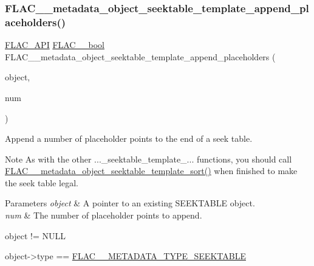 \subsubsection{\texorpdfstring{F\+L\+A\+C\+\_\+\+\_\+metadata\+\_\+object\+\_\+seektable\+\_\+template\+\_\+append\+\_\+placeholders()}{FLAC\_\_metadata\_object\_seektable\_template\_append\_placeholders()}}
{\footnotesize\ttfamily \hyperlink{group__flac__export_ga56ca07df8a23310707732b1c0007d6f5}{F\+L\+A\+C\+\_\+\+A\+PI} \hyperlink{ordinals_8h_a95103469f1cbd78b8cf250194985b34e}{F\+L\+A\+C\+\_\+\+\_\+bool} F\+L\+A\+C\+\_\+\+\_\+metadata\+\_\+object\+\_\+seektable\+\_\+template\+\_\+append\+\_\+placeholders (\begin{DoxyParamCaption}\item[{\hyperlink{struct_f_l_a_c_____stream_metadata}{F\+L\+A\+C\+\_\+\+\_\+\+Stream\+Metadata} $\ast$}]{object,  }\item[{unsigned}]{num }\end{DoxyParamCaption})}

Append a number of placeholder points to the end of a seek table.

\begin{DoxyNote}{Note}
As with the other ...\+\_\+seektable\+\_\+template\+\_\+... functions, you should call \hyperlink{group__flac__metadata__object_gaee6a1f08321b56a3fa65af94dd7830cd}{F\+L\+A\+C\+\_\+\+\_\+metadata\+\_\+object\+\_\+seektable\+\_\+template\+\_\+sort()} when finished to make the seek table legal.
\end{DoxyNote}

\begin{DoxyParams}{Parameters}
{\em object} & A pointer to an existing S\+E\+E\+K\+T\+A\+B\+LE object. \\
\hline
{\em num} & The number of placeholder points to append.  
\begin{DoxyCode}
\textcolor{keywordtype}{object} != NULL 
\end{DoxyCode}
 
\begin{DoxyCode}
\textcolor{keywordtype}{object}->type == \hyperlink{group__flac__format_ggac71714ba8ddbbd66d26bb78a427fac01a5f6323e489be1318f0e3747960ebdd91}{FLAC\_\_METADATA\_TYPE\_SEEKTABLE} 
\end{DoxyCode}
 \\
\hline
\end{DoxyParams}

